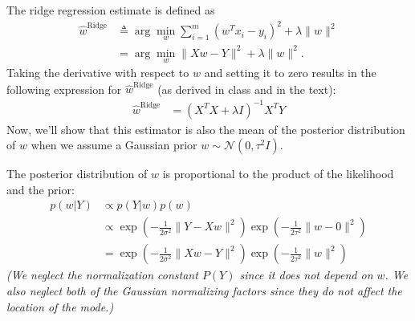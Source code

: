 \documentclass{article}
\begin{document}
The ridge regression estimate is defined as
\begin{align*}
    \hat{w}^{\text{Ridge}} &\triangleq \arg\min_w \sum_{i=1}^{m} (w^T x_i - y_i)^2 + \lambda \|w\|^2\\
    &= \arg\min_w \|Xw - Y\|^2 + \lambda\|w\|^2.
\end{align*}
Taking the derivative with respect to $w$ and setting it to zero results in the following expression for $\hat{w}^{\text{Ridge}}$ (as derived in class and in the text):
\begin{align*}
    \hat{w}^{\text{Ridge}} &= (X^T X + \lambda I)^{-1} X^T Y
\end{align*}
Now, we'll show that this estimator is also the mean of the posterior distribution of $w$ when we assume a Gaussian prior $w \sim \mathcal{N}(0, \tau^2I)$.

The posterior distribution of $w$ is proportional to the product of the likelihood and the prior:
\begin{align*}
    p(w|Y) &\propto p(Y|w)p(w)\\
    &\propto \exp\left(-\frac{1}{2\sigma^2}\|Y - Xw\|^2\right)\exp\left(-\frac{1}{2\tau^2}\|w - 0\|^2\right)\\
    &= \exp\left(-\frac{1}{2\sigma^2}\|Xw - Y\|^2\right)\exp\left(-\frac{1}{2\tau^2}\|w\|^2\right)
\end{align*}
\emph{(We neglect the normalization constant $P(Y)$ since it does not depend on $w$.
We also neglect both of the Gaussian normalizing factors since they do not affect the location of the mode.)}
\end{document}
